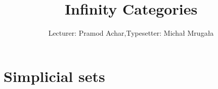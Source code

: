 

\def\CC{\mathcal C}
\def\CS{\mathcal S}
\def\CT{\mathcal T}
\def\Sing{\operatorname{Sing}}
\def\map{\operatorname{map}}
\def\Mor{\operatorname{Mor}}
\def\1b{\mathbb{1}}
\def\R{\bb{R}}
\def\Ch{\cat{Ch}}
\def\Cone{\operatorname{Cone}}
\def\S{\mathbb{S}}
\def\smap{\operatorname{smap}}

\title{Infinity Categories}
\author{Lecturer: Pramod Achar,\quad Typesetter: Micha{\l} Mruga{\l}a}


\maketitle

\section{Simplicial sets}

